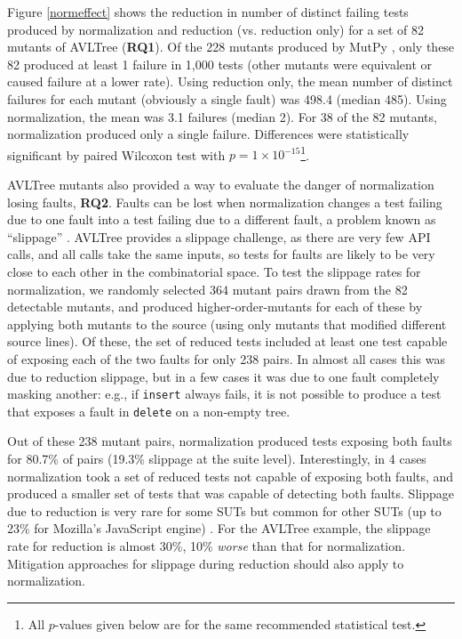 Figure \ref{normeffect} shows the reduction in number of distinct
failing tests produced by normalization and reduction
(vs. reduction only) for a set of 82 mutants \cite{mutant} of AVLTree
\cite{Hunter:2007} ({\bf RQ1}).  Of the 228 mutants produced by MutPy
\cite{mutpy}, only these 82 produced at least 1 failure in 1,000 tests (other mutants were equivalent or caused failure at a lower
rate).  Using reduction only, the mean number of distinct failures for
each mutant (obviously a single fault) was 498.4 (median 485).  Using normalization, the mean
was 3.1 failures (median 2).  For 38 of the 82 mutants,
normalization produced only a single failure.
Differences were statistically significant by paired Wilcoxon test with
$p=1\times10^{-15}$\footnote{All $p$-values given below are for
  the same recommended \cite{arcuri2014hitchhiker} statistical test.}.


AVLTree mutants also provided a way to evaluate the danger of
normalization losing faults, {\bf RQ2}.  Faults can be lost when normalization
changes a test failing due to one fault into a test failing
due to a different fault, a problem known as ``slippage''
\cite{PLDI13,slippage}.  AVLTree provides a slippage challenge, as there are
very few API calls, and all calls take the same inputs, so tests
for faults are likely to be very close to each other in the
combinatorial space.  To test the slippage rates for normalization, we
randomly selected 364 mutant pairs drawn from the 82 detectable
mutants, and produced higher-order-mutants for each of these by
applying both mutants to the source (using only mutants that modified
different source lines).  Of these, the set of reduced tests
included at least one test capable of exposing each of the two faults
for only 238 pairs.  In almost all cases this was due to reduction
slippage, but in a few cases it was due to one fault completely
masking another: e.g., if {\tt insert} always fails, it is not
possible to produce a test that exposes a fault in {\tt delete}
on a non-empty tree.

Out of these 238 mutant pairs, normalization produced tests
exposing both faults for 80.7\% of pairs (19.3\% slippage at the
suite level).  Interestingly, in 4 cases
normalization took a set of reduced tests not capable of exposing
both faults, and produced a smaller set of tests that was capable
of detecting both faults.  Slippage due to
reduction is very rare for some SUTs but common
for other SUTs (up to 23\% for Mozilla's JavaScript engine) \cite{PLDI13}.  For the AVLTree example, the slippage rate for reduction is almost 30\%,
10\% \emph{worse} than that for normalization.  Mitigation approaches
for slippage during reduction \cite{slippage} should also apply to normalization.

